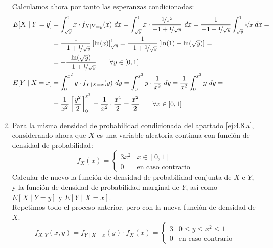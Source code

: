 \begin{ejercicio}
\begin{enumerate}
        Calculamos ahora por tanto las esperanzas condicionadas:
        \begin{align*}
            E[X\mid Y = y] &= \int_{\sqrt{y}}^{1} x\cdot f_{X\mid Y=y}(x) \ dx
            = \int_{\sqrt{y}}^{1} x\cdot \dfrac{\nicefrac{1}{x^2}}{-1 + \nicefrac{1}{\sqrt{y}}} \ dx
            = \dfrac{1}{-1 + \nicefrac{1}{\sqrt{y}}}\int_{\sqrt{y}}^{1} \nicefrac{1}{x} \ dx
            =\\&= \dfrac{1}{-1 + \nicefrac{1}{\sqrt{y}}}\left[\ln(x)\right]_{\sqrt{y}}^{1}
            = \dfrac{1}{-1 + \nicefrac{1}{\sqrt{y}}}\left[\ln(1) - \ln(\sqrt{y})\right]
            =\\&= -\dfrac{\ln(\sqrt{y})}{-1 + \nicefrac{1}{\sqrt{y}}} \qquad\forall y\in[0,1]\\
            E[Y\mid X = x] &= \int_{0}^{x^2} y\cdot f_{Y\mid X=x}(y) \ dy
            = \int_{0}^{x^2} y\cdot \frac{1}{x^2} \ dy
            = \frac{1}{x^2}\int_{0}^{x^2} y \ dy
            =\\&= \frac{1}{x^2}\left[\frac{y^2}{2}\right]_{0}^{x^2}
            = \frac{1}{x^2}\cdot \frac{x^4}{2}
            = \frac{x^2}{2} \qquad \forall x\in[0,1]
        \end{align*}

        
        \item Para la misma densidad de probabilidad condicionada del apartado \ref{ej:4.8.a}, considerando ahora que $X$ es una variable aleatoria continua con función de densidad de probabilidad:
        \begin{equation*}
            f_X(x) = \begin{cases}
                3x^2 & x \in \left[0,1\right]\\
                0 & \text{en caso contrario}
            \end{cases}
        \end{equation*}
        Calcular de nuevo la función de densidad de probabilidad conjunta de $X$ e $Y$, y la función de densidad de probabilidad marginal de $Y$, así como $E[X\mid Y = y]$ y $E[Y\mid X = x]$.\\

        Repetimos todo el proceso anterior, pero con la nueva función de densidad de $X$.
        \begin{equation*}
            f_{X,Y}(x,y) = f_{Y\mid X=x}(y)\cdot f_X(x) = \begin{cases}
                3 & 0\leq y\leq x^2\leq 1\\
                0 & \text{en caso contrario}
            \end{cases}
        \end{equation*}


\end{enumerate}
\end{ejercicio}
